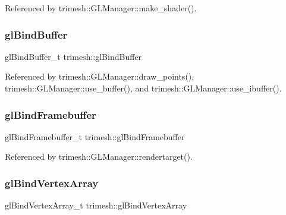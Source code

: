 Referenced by trimesh\+::\+G\+L\+Manager\+::make\+\_\+shader().

\mbox{\label{namespacetrimesh_abbd492b8f24232129584674de7b3aad8}} 
\subsubsection{\texorpdfstring{gl\+Bind\+Buffer}{glBindBuffer}}
{\footnotesize\ttfamily gl\+Bind\+Buffer\+\_\+t trimesh\+::gl\+Bind\+Buffer\hspace{0.3cm}{\ttfamily [static]}}



Referenced by trimesh\+::\+G\+L\+Manager\+::draw\+\_\+points(), trimesh\+::\+G\+L\+Manager\+::use\+\_\+buffer(), and trimesh\+::\+G\+L\+Manager\+::use\+\_\+ibuffer().

\mbox{\label{namespacetrimesh_ae79828a2ea75f5d9c8727fba273f15a0}} 
\subsubsection{\texorpdfstring{gl\+Bind\+Framebuffer}{glBindFramebuffer}}
{\footnotesize\ttfamily gl\+Bind\+Framebuffer\+\_\+t trimesh\+::gl\+Bind\+Framebuffer\hspace{0.3cm}{\ttfamily [static]}}



Referenced by trimesh\+::\+G\+L\+Manager\+::rendertarget().

\mbox{\label{namespacetrimesh_abd42c3d7c6aeceada13664ae96f7a080}} 
\subsubsection{\texorpdfstring{gl\+Bind\+Vertex\+Array}{glBindVertexArray}}
{\footnotesize\ttfamily gl\+Bind\+Vertex\+Array\+\_\+t trimesh\+::gl\+Bind\+Vertex\+Array\hspace{0.3cm}{\ttfamily [static]}}



